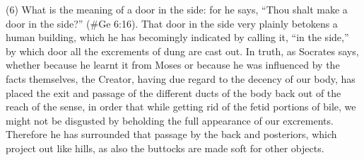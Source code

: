 (6) What is the meaning of a door in the side: for he says, ``Thou shalt make a door in the side?''
(\#Ge 6:16). That door in the side very plainly betokens a human building, which he has
becomingly indicated by calling it, ``in the side,'' by which door all the excrements of dung are cast
out. In truth, as Socrates says, whether because he learnt it from Moses or because he was
influenced by the facts themselves, the Creator, having due regard to the decency of our body, has
placed the exit and passage of the different ducts of the body back out of the reach of the sense,
in order that while getting rid of the fetid portions of bile, we might not be disgusted by beholding the
full appearance of our excrements. Therefore he has surrounded that passage by the back and
posteriors, which project out like hills, as also the buttocks are made soft for other objects.

